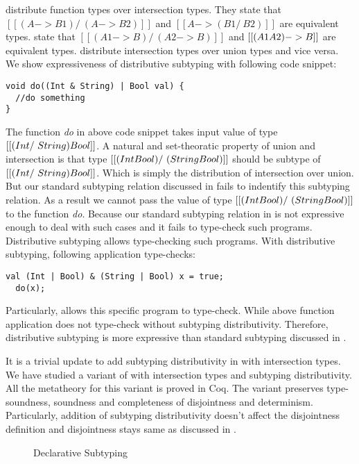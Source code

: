   distribute function types over intersection types.
They state that $[[(A -> B1) /\ (A -> B2)]]$ and $[[A -> (B1 /\ B2)]]$ are equivalent types.
 state that $[[(A1 -> B) /\ (A2 -> B)]]$ and $[[(A1 \/ A2) -> B]]$
are equivalent types.
 distribute intersection types over union types and vice versa.
We show expressiveness of distributive subtyping with following code snippet:

\begin{lstlisting}[xleftmargin=.2\textwidth, xrightmargin=.2\textwidth]
void do((Int & String) | Bool val) {
  //do something
}
\end{lstlisting}

\noindent The function \emph{do} in above code snippet takes input value of type 
$[[(Int /\ String) \/ Bool]]$. A natural and set-theoratic property of union and
intersection is that type $[[(Int \/ Bool) /\ (String \/ Bool)]]$ should be
subtype of $[[(Int /\ String) \/ Bool]]$. Which is simply the distribution
of intersection over union.
But our standard subtyping relation discussed in 
fails to indentify this subtyping relation.
As a result we cannot pass the
value of type $[[(Int \/ Bool) /\ (String \/ Bool)]]$ to the function
\emph{do}. Because our standard subtyping relation in 
is not expressive enough to deal with such cases and it fails to type-check such
programs. Distributive subtyping allows type-checking such programs.
With distributive subtyping, following application type-checks:

\begin{lstlisting}[xleftmargin=.2\textwidth, xrightmargin=.2\textwidth]
  val (Int | Bool) & (String | Bool) x = true;
  do(x);
\end{lstlisting}

\noindent Particularly,  allows this specific program to type-check.
While above function application does not type-check without
subtyping distributivity.
Therefore, distributive subtyping is more expressive than standard subtyping
discussed in .

It is a trivial update to add subtyping distributivity in \cal with
intersection types.
We have studied a variant of \name with intersection types and subtyping distributivity.
All the metatheory for this variant is proved in Coq. The variant preserves
type-soundness, soundness and completeness of disjointness and determinism.
Particularly, addition of subtyping distributivity
doesn't affect the disjointness definition and disjointness stays same as
discussed in .

\begin{figure}[t]
  \caption{Declarative Subtyping}
  \label{fig:discussion:ds}
\end{figure}